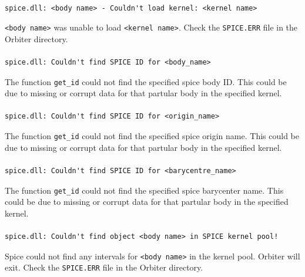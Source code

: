 \documentclass[Orbiter Technical Reference.tex]{subfiles}
\begin{document}
\paragraph{}
\begin{verbatim}
spice.dll: <body name> - Couldn't load kernel: <kernel name>
\end{verbatim}
\texttt{<body name>} was unable to load \texttt{<kernel name>}. Check the \texttt{SPICE.ERR} file in the Orbiter directory.

\paragraph{}
\begin{verbatim}
spice.dll: Couldn't find SPICE ID for <body_name>
\end{verbatim}
The function \texttt{get\_id} could not find the specified spice body ID. This could be due to missing or corrupt data for that partular body in the specified kernel.

\paragraph{}
\begin{verbatim}
spice.dll: Couldn't find SPICE ID for <origin_name>
\end{verbatim}
The function \texttt{get\_id} could not find the specified spice origin name. This could be due to missing or corrupt data for that partular body in the specified kernel.

\paragraph{}
\begin{verbatim}
spice.dll: Couldn't find SPICE ID for <barycentre_name>
\end{verbatim}
The function \texttt{get\_id} could not find the specified spice barycenter name. This could be due to missing or corrupt data for that partular body in the specified kernel.

\paragraph{}
\begin{verbatim}
spice.dll: Couldn't find object <body name> in SPICE kernel pool!
\end{verbatim}
Spice could not find any intervals for \texttt{<body name>} in the kernel pool. Orbiter will exit. Check the \texttt{SPICE.ERR} file in the Orbiter directory.
\end{document}
